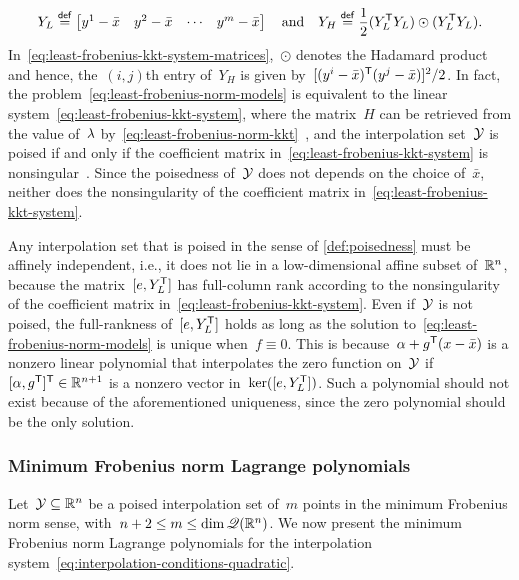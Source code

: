 \begin{equation}
    \label{eq:least-frobenius-kkt-system-matrices}
    Y_L \mathrel{\stackrel{\mathsf{def}}{=}} 
    \begin{bmatrix}
        y^1 - \bar{x}   & y^2 - \bar{x} & \cdots    & y^m - \bar{x}
    \end{bmatrix} \quad \text{and} \quad Y_H \mathrel{\stackrel{\mathsf{def}}{=}} \frac{1}{2} (Y_L^{\mathsf{T}} Y_L) \odot (Y_L^{\mathsf{T}} Y_L).
\end{equation}
%
In~\cref{eq:least-frobenius-kkt-system-matrices},~$\odot$ denotes the Hadamard product and hence, the~$(i, j)$th entry of~$Y_H$ is given by~$[(y^i - \bar{x})^{\mathsf{T}} (y^j - \bar{x})]^2 / 2$.
In fact, the problem~\cref{eq:least-frobenius-norm-models} is equivalent to the linear system~\cref{eq:least-frobenius-kkt-system}, where the matrix~$H$ can be retrieved from the value of~$\lm$ by~\cref{eq:least-frobenius-norm-kkt}~\cite[\S~2]{Powell_2004b}, and the interpolation set~$\xpt$ is poised if and only if the coefficient matrix in~\cref{eq:least-frobenius-kkt-system} is nonsingular~\cite[\S~5.3]{Conn_Scheinberg_Vicente_2009b}.
Since the poisedness of~$\xpt$ does not depends on the choice of~$\bar{x}$, neither does the nonsingularity of the coefficient matrix in~\cref{eq:least-frobenius-kkt-system}.

Any interpolation set that is poised in the sense of \cref{def:poisedness} must be affinely independent, i.e., it does not lie in a low-dimensional affine subset of~$\mathbb{R}^n$, because the matrix~$[e, Y_L^{\mathsf{T}}]$ has full-column rank according to the nonsingularity of the coefficient matrix in~\cref{eq:least-frobenius-kkt-system}.
Even if~$\xpt$ is not poised, the full-rankness of~$[e, Y_L^{\mathsf{T}}]$ holds as long as the solution to~\cref{eq:least-frobenius-norm-models} is unique when~$f \equiv 0$.
This is because~$\alpha + g^{\T} (\iter - \bar{x})$ is a nonzero linear polynomial that interpolates the zero function on~$\xpt$ if~$[\alpha, g^{\mathsf{T}}]^{\mathsf{T}} \in \mathbb{R}^{n + 1}$ is a nonzero vector in~$\ker([e, Y_L^{\mathsf{T}}])$.
Such a polynomial should not exist because of the aforementioned uniqueness, since the zero polynomial should be the only solution.

\subsubsection{Minimum Frobenius norm Lagrange polynomials}

Let~$\xpt \subseteq \R^n$ be a poised interpolation set of~$m$ points in the minimum Frobenius norm sense, with~$n + 2 \le m \le \dim \mathscr{Q}(\mathbb{R}^n)$.
We now present the minimum Frobenius norm Lagrange polynomials for the interpolation system~\cref{eq:interpolation-conditions-quadratic}.

